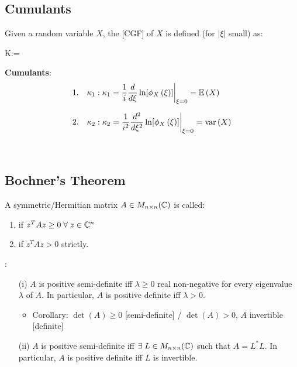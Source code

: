 \documentclass[12pt]{extarticle}
\begin{document}
\subsection{Cumulants}
\begin{tcolorbox}[colback=white]
    \begin{definition}
        Given a random variable $X$, the  [CGF] of $X$ is defined (for $|\xi|$ small) as: \begin{eqnbox}
            K:\xi\mapsto \ln[\expected{e^{i\xi X}}]=\ln[\charfn{X}{\xi}]
        \end{eqnbox}
    \end{definition}
    
    \newp
    \textbf{Cumulants}:
    \begin{align*}
        1.\quad\kappa_1:&\;\kappa_1=\frac{1}{i}\frac{d}{d\xi}\ln[\phi_{X}\left(\xi\right)]\bigg\vert_{\xi=0}=\mathbb{E}\left(X\right) \\[6pt]
        2.\quad\kappa_2:&\;\kappa_2=\frac{1}{i^2}\frac{d^2}{d\xi^2}\ln[\phi_{X}\left(\xi\right)]\bigg\vert_{\xi=0}=\text{var}\left(X\right)
    \end{align*}
\end{tcolorbox}

~\\
\subsection{Bochner's Theorem}
\begin{recall}
    A symmetric/Hermitian matrix $A\in M_{n\times n}(\mathbb{C})$ is called: \begin{enumerate}
        \item {} if $z^TAz\geq0\;\forall\; z\in\mathbb{C}^n$
        \item {} if $z^TAz>0$ strictly.
    \end{enumerate}

    \vspace{8pt}\pstart
    : \begin{enumerate}
        \item[(i)] $A$ is positive semi-definite iff $\lambda\geq0$ real non-negative for every eigenvalue $\lambda$ of $A$. In particular, $A$ is positive definite iff $\lambda>0$. \begin{itemize}
            \item Corollary: $\det(A)\geq0$ [semi-definite] / $\det(A)>0$, $A$ invertible [definite]
        \end{itemize}
        \item[(ii)] $A$ is positive semi-definite iff $\exists\;L\in M_{n\times n}(\mathbb{C})$ such that $A=L^\ast L$. In particular, $A$ is positive definite iff $L$ is invertible.
    \end{enumerate}
\end{recall} \vspace{8pt}
\end{document}
